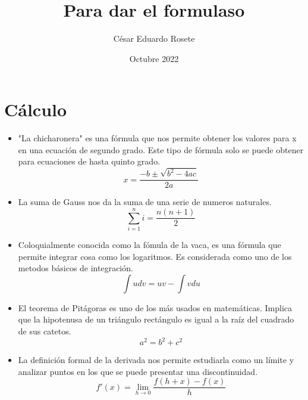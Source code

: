 \documentclass[letterpaper,global 12pt]{article}
\title{Para dar el formulaso }
\author{César Eduardo Rosete}
\date{Octubre 2022}
\begin{document}
\lhead{\leftmark}
\rhead{\thepage}
\lfoot{\leftmark}
\rfoot{\thepage}
\maketitle
{}
\section{Cálculo}
\begin{itemize}
    \item[\Large\ddagger] "La chicharonera" es una fórmula que nos permite obtener los valores para x en una ecuación de segundo grado. Este tipo de fórmula solo se puede obtener para ecuaciones de hasta quinto grado. 
    \begin{equation*}
        x=\frac{-b\pm\sqrt{b^2-4ac}}{2a}
    \end{equation*}\color{magenta}
    \item[\mho]La suma de Gauss nos da la suma de una serie de numeros naturales. 
    \begin{equation*}
        \sum_{i=1}^{n}i=\frac{n(n+1)}{2}
    \end{equation*}\color{black}
    \item [\Large\dagger] Coloquialmente conocida como la fómula de la vaca, es una fórmula que permite integrar cosa como los logaritmos. Es considerada como uno de los metodos básicos de integración.
    \begin{equation*}
    \int udv=uv-\int vdu
    \end{equation*}
    \item[\clubsuit] El teorema de Pitágoras es uno de los más usados en matemáticas. Implica que la hipotenusa de un triángulo rectángulo es igual a la raíz del cuadrado de sus catetos. 
    \begin{equation*}
        a^2=b^2+c^2
    \end{equation*}
    \item[\heartsuit] La definición formal de la derivada nos permite estudiarla como un límite y analizar puntos en los que se puede presentar una discontinuidad. 
    \begin{equation*}
        f'(x)=\lim_{h\to 0}\frac{f(h+x)-f(x)}{h}
    \end{equation*}
\end{itemize}
\end{document}
